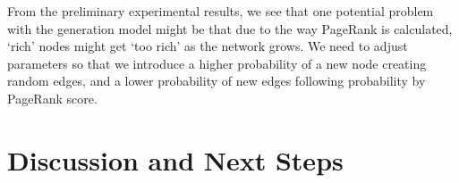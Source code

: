\documentclass[10pt]{article}
\begin{document}
\begin{multicols}{2}
From the preliminary experimental results, we see that one potential problem with the generation model might be that due to the way PageRank is calculated, `rich' nodes might get `too rich' as the network grows. We need to adjust parameters so that we introduce a higher probability of a new node creating random edges, and a lower probability of new edges following probability by PageRank score.

\section{Discussion and Next Steps} 




\end{multicols}
\end{document}
